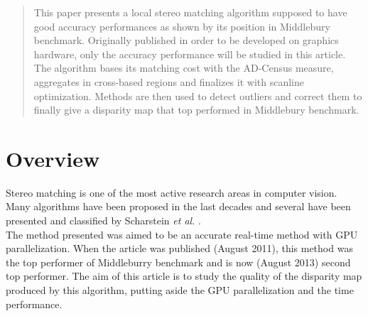 \documentclass{ipol}
\begin{document}
\begin{abstract}
This paper presents a local stereo matching algorithm supposed to have good accuracy performances as shown by its position in Middlebury benchmark. Originally published in order to be developed on graphics hardware, only the accuracy performance will be studied in this article. The algorithm bases its matching cost with the AD-Census measure, aggregates in cross-based regions and finalizes it with scanline optimization. Methods are then used to detect outliers and correct them to finally give a disparity map that top performed in Middlebury benchmark.
\end{abstract} 

\section{Overview}

Stereo matching is one of the most active research areas in computer vision. Many algorithms have been proposed in the last decades and several have been presented and classified by Scharstein \textit{et al.} \cite{stereoTaxonomy}.\\
The method \cite{adCensus} presented was aimed to be an accurate real-time method with GPU parallelization. When the article was published (August 2011), this method was the top performer of Middleburry benchmark \cite{middleBench} and is now (August 2013) second top performer. The aim of this article is to study the quality of the disparity map produced by this algorithm, putting aside the GPU parallelization and the time performance.\\
\end{document}
